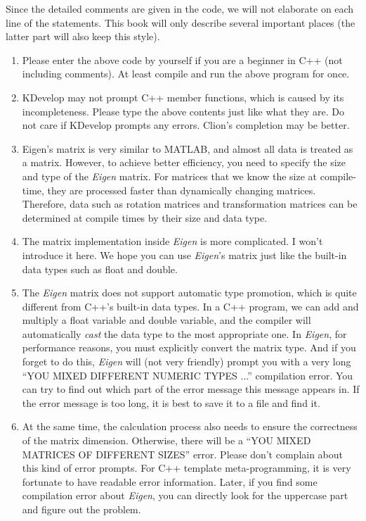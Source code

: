 Since the detailed comments are given in the code, we will not elaborate on each line of the statements. This book will only describe several important places (the latter part will also keep this style).

\begin{enumerate}
    \item Please enter the above code by yourself if you are a beginner in C++ (not including comments). At least compile and run the above program for once.
    
    \item KDevelop may not prompt C++ member functions, which is caused by its incompleteness. Please type the above contents just like what they are. Do not care if KDevelop prompts any errors. Clion's completion may be better. 
    
    \item Eigen's matrix is very similar to MATLAB, and almost all data is treated as a matrix. However, to achieve better efficiency, you need to specify the size and type of the \textit{Eigen} matrix. For matrices that we know the size at compile-time, they are processed faster than dynamically changing matrices. Therefore, data such as rotation matrices and transformation matrices can be determined at compile times by their size and data type.
    
    \item The matrix implementation inside  \textit{Eigen} is more complicated. I won't introduce it here. We hope you can use \textit{Eigen}'s matrix just like the built-in data types such as float and double.
    
    \item The \textit{Eigen} matrix does not support automatic type promotion, which is quite different from C++'s built-in data types. In a C++ program, we can add and multiply a float variable and double variable, and the compiler will automatically \textit{cast} the data type to the most appropriate one. In \textit{Eigen}, for performance reasons, you must explicitly convert the matrix type. And if you forget to do this, \textit{Eigen} will (not very friendly) prompt you with a very long ``YOU MIXED DIFFERENT NUMERIC TYPES ...'' compilation error. You can try to find out which part of the error message this message appears in. If the error message is too long, it is best to save it to a file and find it.
    
    \item At the same time, the calculation process also needs to ensure the correctness of the matrix dimension. Otherwise, there will be a ``YOU MIXED MATRICES OF DIFFERENT SIZES'' error. Please don't complain about this kind of error prompts. For C++ template meta-programming, it is very fortunate to have readable error information. Later, if you find some compilation error about \textit{Eigen}, you can directly look for the uppercase part and figure out the problem.
    

\end{enumerate}
